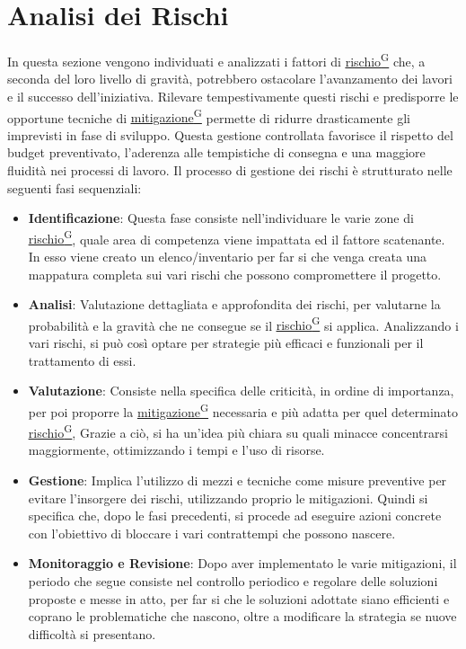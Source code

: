 \documentclass[a4paper,12pt]{article}
\providecommand{\glslink}[2]{\href{https://alittlebyte-19.github.io/Documentazione/glossario.html\#gls-#1}{\underline{#2}\textsuperscript{\scriptsize G}}}
\begin{document}
\section{Analisi dei Rischi}
\label{sec:analisi_dei_rischi}
In questa sezione vengono individuati e analizzati i fattori di \glslink{rischio}{rischio} che, a seconda del loro livello di gravità, potrebbero ostacolare l'avanzamento dei lavori e il successo dell'iniziativa. Rilevare tempestivamente questi rischi e predisporre le opportune tecniche di \glslink{mitigazione-dei-rischi}{mitigazione} permette di ridurre drasticamente gli imprevisti in fase di sviluppo. Questa gestione controllata favorisce il rispetto del budget preventivato, l'aderenza alle tempistiche di consegna e una maggiore fluidità nei processi di lavoro. Il processo di gestione dei rischi è strutturato nelle seguenti fasi sequenziali:
\begin{itemize}
    \item \textbf{Identificazione}: Questa fase consiste nell'individuare le varie zone di \glslink{rischio}{rischio}, quale area di competenza viene impattata ed il fattore scatenante.
    In esso viene creato un elenco/inventario per far si che venga creata una mappatura completa sui vari rischi che possono compromettere il progetto.
    \item \textbf{Analisi}: Valutazione dettagliata e approfondita dei rischi, per valutarne la probabilità e la gravità che ne consegue se il \glslink{rischio}{rischio} si applica.
    Analizzando i vari rischi, si può così optare per strategie più efficaci e funzionali per il trattamento di essi.
    \item \textbf{Valutazione}: Consiste nella specifica delle criticità, in ordine di importanza, per poi proporre la \glslink{mitigazione-dei-rischi}{mitigazione} necessaria e più adatta per quel determinato \glslink{rischio}{rischio},
    Grazie a ciò, si ha un'idea più chiara su quali minacce concentrarsi maggiormente, ottimizzando i tempi e l'uso di risorse.
    \item \textbf{Gestione}: Implica l'utilizzo di mezzi e tecniche come misure preventive per evitare l'insorgere dei rischi, utilizzando proprio le mitigazioni.
    Quindi si specifica che, dopo le fasi precedenti, si procede ad eseguire azioni concrete con l'obiettivo di bloccare i vari contrattempi che possono nascere.
    \item \textbf{Monitoraggio e Revisione}: Dopo aver implementato le varie mitigazioni, il periodo che segue consiste nel controllo periodico e regolare delle soluzioni proposte e messe in atto,
    per far si che le soluzioni adottate siano efficienti e coprano le problematiche che nascono, oltre a modificare la strategia se nuove difficoltà si presentano.
\end{itemize}
\end{document}
